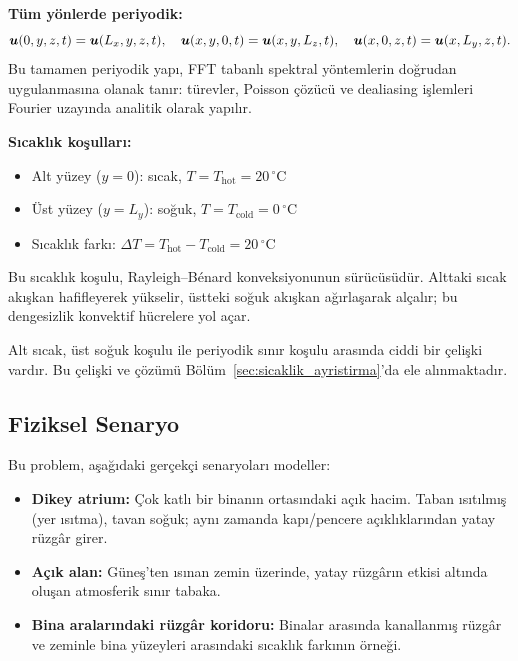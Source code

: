 \textbf{Tüm yönlerde periyodik:}
\begin{equation}
    \bm{u}(0, y, z, t) = \bm{u}(L_x, y, z, t), \quad
    \bm{u}(x, y, 0, t) = \bm{u}(x, y, L_z, t), \quad
    \bm{u}(x, 0, z, t) = \bm{u}(x, L_y, z, t).
    \label{eq:periodic_bc}
\end{equation}
Bu tamamen periyodik yapı, FFT tabanlı spektral yöntemlerin doğrudan uygulanmasına olanak tanır: türevler, Poisson çözücü ve dealiasing işlemleri Fourier uzayında analitik olarak yapılır.

\textbf{Sıcaklık koşulları:}
\begin{itemize}
    \item Alt yüzey ($y = 0$): sıcak, $T = T_{\text{hot}} = 20\,^{\circ}\mathrm{C}$
    \item Üst yüzey ($y = L_y$): soğuk, $T = T_{\text{cold}} = 0\,^{\circ}\mathrm{C}$
    \item Sıcaklık farkı: $\Delta T = T_{\text{hot}} - T_{\text{cold}} = 20\,^{\circ}\mathrm{C}$
\end{itemize}
Bu sıcaklık koşulu, Rayleigh--B\'{e}nard konveksiyonunun sürücüsüdür. Alttaki sıcak akışkan hafifleyerek yükselir, üstteki soğuk akışkan ağırlaşarak alçalır; bu dengesizlik konvektif hücrelere yol açar.

\begin{remark}
Alt sıcak, üst soğuk koşulu ile periyodik sınır koşulu arasında ciddi bir çelişki vardır. Bu çelişki ve çözümü Bölüm~\ref{sec:sicaklik_ayristirma}'da ele alınmaktadır.
\end{remark}

\subsection{Fiziksel Senaryo}

Bu problem, aşağıdaki gerçekçi senaryoları modeller:
\begin{itemize}
    \item \textbf{Dikey atrium:} Çok katlı bir binanın ortasındaki açık hacim. Taban ısıtılmış (yer ısıtma), tavan soğuk; aynı zamanda kapı/pencere açıklıklarından yatay rüzgâr girer.
    \item \textbf{Açık alan:} Güneş'ten ısınan zemin üzerinde, yatay rüzgârın etkisi altında oluşan atmosferik sınır tabaka.
    \item \textbf{Bina aralarındaki rüzgâr koridoru:} Binalar arasında kanallanmış rüzgâr ve zeminle bina yüzeyleri arasındaki sıcaklık farkının örneği.
\end{itemize}

